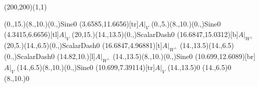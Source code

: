 \unitlength=1bp%

\begin{feynartspicture}(200,200)(1,1)

\FADiagram{}
\FAProp(0.,15.)(8.,10.)(0.,){Sine}{0}
\FALabel(3.6585,11.6656)[tr]{$A|_V$}
\FAProp(0.,5.)(8.,10.)(0.,){Sine}{0}
\FALabel(4.3415,6.6656)[tl]{$A|_V$}
\FAProp(20,15.)(14.,13.5)(0.,){ScalarDash}{0}
\FALabel(16.6847,15.0312)[b]{$A|_{W^\perp}$}
\FAProp(20,5.)(14.,6.5)(0.,){ScalarDash}{0}
\FALabel(16.6847,4.96881)[t]{$A|_{W^\perp}$}
\FAProp(14.,13.5)(14.,6.5)(0.,){ScalarDash}{0}
\FALabel(14.82,10.)[l]{$A|_{W^\perp}$}
\FAProp(14.,13.5)(8.,10.)(0.,){Sine}{0}
\FALabel(10.699,12.6089)[br]{$A|_V$}
\FAProp(14.,6.5)(8.,10.)(0.,){Sine}{0}
\FALabel(10.699,7.39114)[tr]{$A|_V$}
\FAVert(14.,13.5){0}
\FAVert(14.,6.5){0}
\FAVert(8.,10.){0}
\end{feynartspicture}

